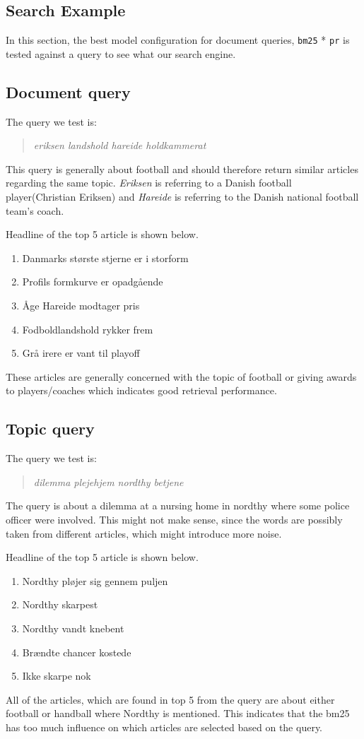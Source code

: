 \subsection{Search Example}
In this section, the best model configuration for document queries, \texttt{\gls{bm25}} * \texttt{\gls{pr}} is tested against a query to see what our search engine.


\subsection{Document query}
The query we test is:
\begin{quotation}
	\textit{eriksen landshold hareide holdkammerat}
\end{quotation}
This query is generally about football and should therefore return similar articles regarding the same topic.
\textit{Eriksen} is referring to a Danish football player(Christian Eriksen) and \textit{Hareide} is referring to the Danish national football team's coach.


\noindent Headline of the top 5 article is shown below.
\begin{enumerate}
	\item Danmarks største stjerne er i storform
	\item Profils formkurve er opadgående
	\item Åge Hareide modtager pris
	\item Fodboldlandshold rykker frem
	\item Grå irere er vant til playoff
\end{enumerate}
These articles are generally concerned with the topic of football or giving awards to players/coaches which indicates good retrieval performance.


\subsection{Topic query}
The query we test is:
\begin{quotation}
	\textit{dilemma plejehjem nordthy betjene}
\end{quotation}
The query is about a dilemma at a nursing home in nordthy where some police officer were involved. 
This might not make sense, since the words are possibly taken from different articles, which might introduce more noise.

\noindent Headline of the top 5 article is shown below.
\begin{enumerate}
	\item Nordthy pløjer sig gennem puljen
	\item Nordthy skarpest
	\item Nordthy vandt knebent
	\item Brændte chancer kostede
	\item Ikke skarpe nok
\end{enumerate}
All of the articles, which are found in top 5 from the query are about either football or handball where Nordthy is mentioned.
This indicates that the \gls{bm25} has too much influence on which articles are selected based on the query.
